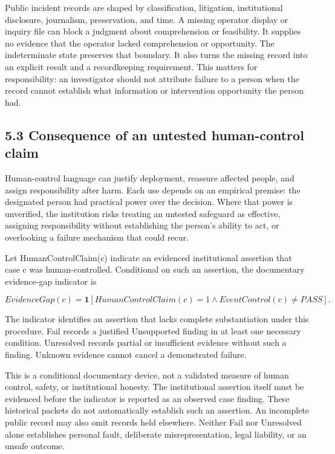 \documentclass[11pt]{article}
\begin{document}
Public incident records are shaped by classification, litigation, institutional disclosure, journalism, preservation, and time. A missing operator display or inquiry file can block a judgment about comprehension or feasibility. It supplies no evidence that the operator lacked comprehension or opportunity. The indeterminate state preserves that boundary. It also turns the missing record into an explicit result and a recordkeeping requirement. This matters for responsibility: an investigator should not attribute failure to a person when the record cannot establish what information or intervention opportunity the person had.

\subsection*{5.3 Consequence of an untested human-control claim}

Human-control language can justify deployment, reassure affected people, and assign responsibility after harm. Each use depends on an empirical premise: the designated person had practical power over the decision. Where that power is unverified, the institution risks treating an untested safeguard as effective, assigning responsibility without establishing the person's ability to act, or overlooking a failure mechanism that could recur.

Let HumanControlClaim(c) indicate an evidenced institutional assertion that case c was human-controlled. Conditional on such an assertion, the documentary evidence-gap indicator is

\[
EvidenceGap(c)=\mathbf{1}[HumanControlClaim(c)=1\land EventControl(c)\neq PASS].
\]

The indicator identifies an assertion that lacks complete substantiation under this procedure. Fail records a justified Unsupported finding in at least one necessary condition. Unresolved records partial or insufficient evidence without such a finding. Unknown evidence cannot cancel a demonstrated failure.

This is a conditional documentary device, not a validated measure of human control, safety, or institutional honesty. The institutional assertion itself must be evidenced before the indicator is reported as an observed case finding. These historical packets do not automatically establish such an assertion. An incomplete public record may also omit records held elsewhere. Neither Fail nor Unresolved alone establishes personal fault, deliberate misrepresentation, legal liability, or an unsafe outcome.
\end{document}
